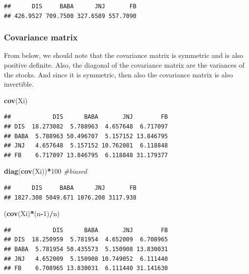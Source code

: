 \documentclass[]{article}
\newenvironment{Shaded}{\begin{snugshade}}{\end{snugshade}}
\newcommand{\KeywordTok}[1]{\textcolor[rgb]{0.13,0.29,0.53}{\textbf{#1}}}
\newcommand{\DecValTok}[1]{\textcolor[rgb]{0.00,0.00,0.81}{#1}}
\newcommand{\CommentTok}[1]{\textcolor[rgb]{0.56,0.35,0.01}{\textit{#1}}}
\newcommand{\OperatorTok}[1]{\textcolor[rgb]{0.81,0.36,0.00}{\textbf{#1}}}
\newcommand{\NormalTok}[1]{#1}
\begin{document}
\begin{verbatim}
##      DIS     BABA      JNJ       FB 
## 426.9527 709.7500 327.6589 557.7090
\end{verbatim}

\subsubsection{Covariance matrix}\label{covariance-matrix}

From below, we should note that the covariance matrix is symmetric and
is also positive definite. Also, the diagonal of the covariance matrix
are the variances of the stocks. And since it is symmetric, then also
the covariance matrix is also invertible.

\begin{Shaded}
\begin{Highlighting}[]
\KeywordTok{cov}\NormalTok{(Xi)}
\end{Highlighting}
\end{Shaded}

\begin{verbatim}
##            DIS      BABA       JNJ        FB
## DIS  18.273082  5.788963  4.657648  6.717097
## BABA  5.788963 50.496707  5.157152 13.846795
## JNJ   4.657648  5.157152 10.762081  6.118848
## FB    6.717097 13.846795  6.118848 31.179377
\end{verbatim}

\begin{Shaded}
\begin{Highlighting}[]
\KeywordTok{diag}\NormalTok{(}\KeywordTok{cov}\NormalTok{(Xi))}\OperatorTok{*}\DecValTok{100} \CommentTok{#biased}
\end{Highlighting}
\end{Shaded}

\begin{verbatim}
##      DIS     BABA      JNJ       FB 
## 1827.308 5049.671 1076.208 3117.938
\end{verbatim}

\begin{Shaded}
\begin{Highlighting}[]
\NormalTok{(}\KeywordTok{cov}\NormalTok{(Xi)}\OperatorTok{*}\NormalTok{(n}\OperatorTok{-}\DecValTok{1}\NormalTok{)}\OperatorTok{/}\NormalTok{n)}
\end{Highlighting}
\end{Shaded}

\begin{verbatim}
##            DIS      BABA       JNJ        FB
## DIS  18.250959  5.781954  4.652009  6.708965
## BABA  5.781954 50.435573  5.150908 13.830031
## JNJ   4.652009  5.150908 10.749052  6.111440
## FB    6.708965 13.830031  6.111440 31.141630
\end{verbatim}
\end{document}
